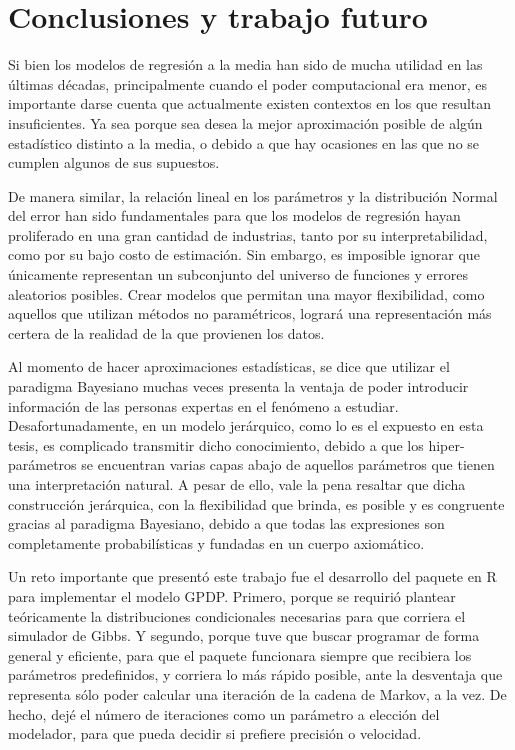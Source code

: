 \chapter[Conclusiones y trabajo futuro]{Conclusiones y trabajo futuro}

Si bien los modelos de regresi\'on a la media han sido de mucha utilidad en las \'ultimas d\'ecadas, principalmente cuando el poder computacional era menor, es importante darse cuenta que actualmente existen contextos en los que resultan insuficientes. Ya sea porque sea desea la mejor aproximaci\'on posible de alg\'un estad\'istico distinto a la media, o debido a que hay ocasiones en las que no se cumplen algunos de sus supuestos.

De manera similar, la relaci\'on lineal en los par\'ametros y la distribuci\'on Normal del error han sido fundamentales para que los modelos de regresi\'on hayan proliferado en una gran cantidad de industrias, tanto por su interpretabilidad, como por su bajo costo de estimaci\'on. Sin embargo, es imposible ignorar que \'unicamente representan un subconjunto del universo de funciones y errores aleatorios posibles. Crear modelos que permitan una mayor flexibilidad, como aquellos que utilizan m\'etodos no param\'etricos, lograr\'a una representaci\'on m\'as certera de la realidad de la que provienen los datos.

Al momento de hacer aproximaciones estad\'isticas, se dice que utilizar el paradigma Bayesiano muchas veces presenta la ventaja de poder introducir informaci\'on de las personas expertas en el fen\'omeno a estudiar. Desafortunadamente, en un modelo jer\'arquico, como lo es el expuesto en esta tesis, es complicado transmitir dicho conocimiento, debido a que los hiper-par\'ametros se encuentran varias capas abajo de aquellos par\'ametros que tienen una interpretaci\'on natural. A pesar de ello, vale la pena resaltar que dicha construcci\'on jer\'arquica, con la flexibilidad que brinda, es posible y es congruente gracias al paradigma Bayesiano, debido a que todas las expresiones son completamente probabil\'isticas y fundadas en un cuerpo axiom\'atico. 

Un reto importante que present\'o este trabajo fue el desarrollo del paquete en R para implementar el modelo GPDP. Primero, porque se requiri\'o plantear te\'oricamente la distribuciones condicionales necesarias para que corriera el simulador de Gibbs. Y segundo, porque tuve que buscar programar de forma general y eficiente, para que el paquete funcionara siempre que recibiera los par\'ametros predefinidos, y corriera lo m\'as r\'apido posible, ante la desventaja que representa s\'olo poder calcular una iteraci\'on de la cadena de Markov, a la vez. De hecho, dej\'e el n\'umero de iteraciones como un par\'ametro a elecci\'on del modelador, para que pueda decidir si prefiere precisi\'on o velocidad.

